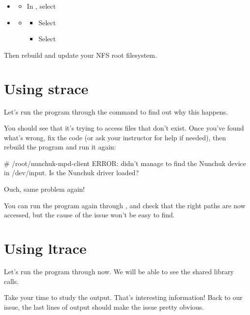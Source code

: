 \begin{itemize}
\item {}
  \begin{itemize}
  \item In , select 
  \end{itemize}
\item {} 
  \begin{itemize}
  \item {}
    \begin{itemize}
    \item Select 
    \item Select 
    \end{itemize}
  \end{itemize}
\end{itemize}

Then rebuild and update your NFS root filesystem.

\section{Using strace}

Let's run the program through the  command to find out why
this happens.

You should see that it's trying to access files that don't exist.
Once you've found what's wrong, fix the code (or ask your instructor for
help if needed), then rebuild the program and run it again:

\begin{bashinput}
# /root/nunchuk-mpd-client
ERROR: didn't manage to find the Nunchuk device in /dev/input. Is the Nunchuk driver loaded?
\end{bashinput}

Ouch, same problem again!

You can run the program again through , and check that the
right paths are now accessed, but the cause of the issue won't be easy
to find.

\section{Using ltrace}

Let's run the program through  now. We will be able to see
the shared library calls.

Take your time to study the  output. That's interesting
information! Back to our issue, the last lines of output should make the
issue pretty obvious.

